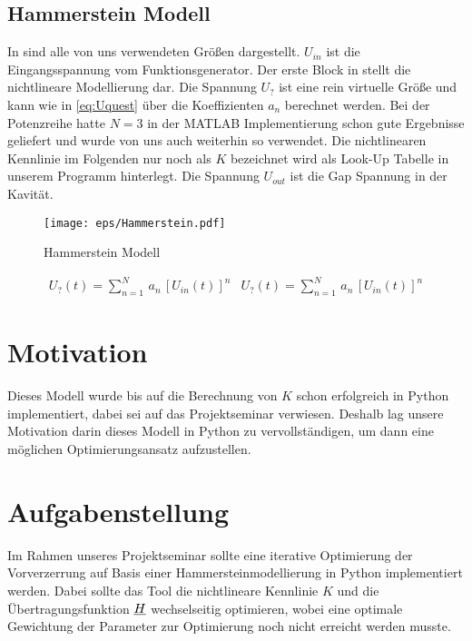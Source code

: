\documentclass[../Report.tex]{subfiles}
\begin{document}
\subsection{Hammerstein Modell}
\label{subsec:einf.modell_BB.hammerstein}
In  sind alle von uns verwendeten Größen dargestellt. $U_{in}$ ist die Eingangsspannung vom Funktionsgenerator. Der erste Block in  stellt die nichtlineare Modellierung dar. Die Spannung $U_{?}$ ist eine rein virtuelle Größe und kann wie in \ref{eq:Uquest} über die Koeffizienten $a_n$ berechnet werden. Bei der Potenzreihe hatte $N = 3$ in der MATLAB Implementierung schon gute Ergebnisse geliefert und wurde von uns auch weiterhin so verwendet. Die nichtlinearen Kennlinie im Folgenden nur noch als $K$ bezeichnet wird als Look-Up Tabelle in unserem Programm hinterlegt. Die Spannung $U_{out}$ ist die Gap Spannung in der Kavität.
\begin{figure}[H]
	\centering
	\texttt{[image: eps/Hammerstein.pdf]}
	\caption{Hammerstein Modell}
  	\label{fig:Hammerstein}
\end{figure}
\begin{align}
	U_?(t)=\sum_{n=1}^N \, a_n \, \left[ U_{in}(t) \right]^n
	\label{eq:Uquest}
	&
	U_?(t)=\sum_{n=1}^N \, a_n \, \left[ U_{in}(t) \right]^n	
\end{align}


\section{Motivation}
\label{sec:einf.motivation}
Dieses Modell wurde bis auf die Berechnung von $K$ schon erfolgreich in Python implementiert, dabei sei auf das Projektseminar \cite{PJS_Denys} verwiesen. Deshalb lag unsere Motivation darin dieses Modell in Python zu vervollständigen, um dann eine möglichen Optimierungsansatz aufzustellen.


\section{Aufgabenstellung}
\label{sec:einf.problem}
Im Rahmen unseres Projektseminar sollte eine iterative Optimierung der Vorverzerrung auf Basis einer Hammersteinmodellierung in Python implementiert werden. Dabei sollte das Tool die nichtlineare Kennlinie $K$ und die Übertragungsfunktion $\underline{H}$ wechselseitig optimieren, wobei eine optimale Gewichtung der Parameter zur Optimierung noch nicht erreicht werden musste.
\end{document}
